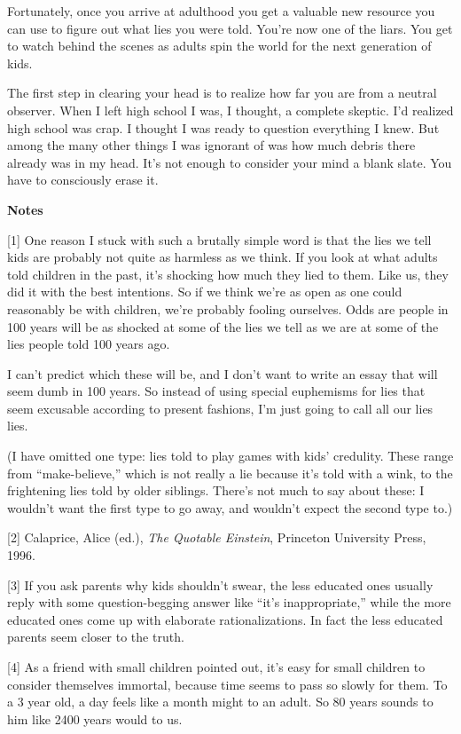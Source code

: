 Fortunately, once you arrive at adulthood you get a valuable new
resource you can use to figure out what lies you were told. You're now
one of the liars. You get to watch behind the scenes as adults spin the
world for the next generation of kids.

The first step in clearing your head is to realize how far you are from
a neutral observer. When I left high school I was, I thought, a complete
skeptic. I'd realized high school was crap. I thought I was ready to
question everything I knew. But among the many other things I was
ignorant of was how much debris there already was in my head. It's not
enough to consider your mind a blank slate. You have to consciously
erase it.

\textbf{Notes}

{[}1{]} One reason I stuck with such a brutally simple word is that the
lies we tell kids are probably not quite as harmless as we think. If you
look at what adults told children in the past, it's shocking how much
they lied to them. Like us, they did it with the best intentions. So if
we think we're as open as one could reasonably be with children, we're
probably fooling ourselves. Odds are people in 100 years will be as
shocked at some of the lies we tell as we are at some of the lies people
told 100 years ago.

I can't predict which these will be, and I don't want to write an essay
that will seem dumb in 100 years. So instead of using special euphemisms
for lies that seem excusable according to present fashions, I'm just
going to call all our lies lies.

(I have omitted one type: lies told to play games with kids' credulity.
These range from ``make-believe,'' which is not really a lie because
it's told with a wink, to the frightening lies told by older siblings.
There's not much to say about these: I wouldn't want the first type to
go away, and wouldn't expect the second type to.)

{[}2{]} Calaprice, Alice (ed.), \emph{The Quotable Einstein}, Princeton
University Press, 1996.

{[}3{]} If you ask parents why kids shouldn't swear, the less educated
ones usually reply with some question-begging answer like ``it's
inappropriate,'' while the more educated ones come up with elaborate
rationalizations. In fact the less educated parents seem closer to the
truth.

{[}4{]} As a friend with small children pointed out, it's easy for small
children to consider themselves immortal, because time seems to pass so
slowly for them. To a 3 year old, a day feels like a month might to an
adult. So 80 years sounds to him like 2400 years would to us.

